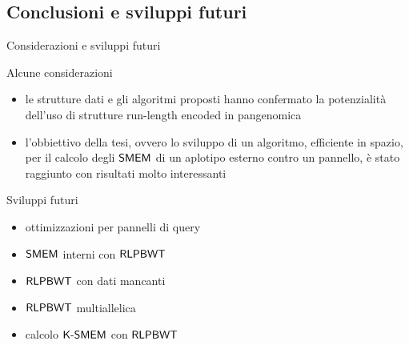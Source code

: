 \documentclass[]{beamer}
\def\KSMEM{\mbox{\rm {\sf K-SMEM}}}
\def\RLPBWT{\mbox{\rm {\sf RLPBWT}}}
\def\SMEM{\mbox{\rm {\sf SMEM}}}
\begin{document}
\subsection{Conclusioni e sviluppi futuri}
\begin{frame}{Considerazioni e sviluppi futuri}
  \begin{block}{Alcune considerazioni}
    \small
    \begin{itemize}
      \item le strutture dati e gli algoritmi proposti hanno
      confermato la potenzialità dell'uso di strutture run-length encoded in
      pangenomica
      \item l'obbiettivo della tesi, ovvero lo sviluppo di un algoritmo,
      efficiente in spazio, per il calcolo degli $\SMEM$ di un aplotipo esterno
      contro un pannello, è stato raggiunto con risultati molto interessanti
    \end{itemize}
  \end{block}
  \begin{block}{Sviluppi futuri}
    \small
    \begin{multicols}{2}
      \begin{itemize}
        \item ottimizzazioni per pannelli di query
        \item $\SMEM$ interni con $\RLPBWT$
        \item $\RLPBWT$ con dati mancanti
        \item $\RLPBWT$ multiallelica
        \item calcolo $\KSMEM$ con $\RLPBWT$
      \end{itemize}
    \end{multicols}
  \end{block}
\end{frame}
\end{document}
